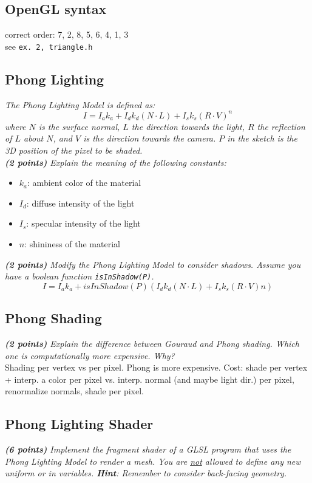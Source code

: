 \documentclass[a4paper,10pt]{article}
\begin{document}
\subsection{OpenGL syntax}
correct order: 
7, 2, 8, 5, 6, 4, 1, 3\\
see \texttt{ex. 2, triangle.h}
\subsection{Phong Lighting}
\textit{The Phong Lighting Model is defined as:}
\[I=I_ak_a+I_dk_d(N\cdot L)+I_sk_s(R\cdot V)^n\]
\textit{where  $N$  is  the  surface  normal,  $L$  the  direction  towards  the  light,  $R$  the  reflection  of  $L$  about  $N$,  and  $V$  is  the  direction  towards  the  camera. $P$ in the sketch is the 3D position of the pixel to be shaded.}\\

\textit{\textbf{(2 points)} Explain the meaning of the following constants:}
\begin{itemize}
	\item $k_a$: ambient color of the material
	\item $I_d$: diffuse intensity of the light
	\item $I_s$: specular intensity of the light
	\item $n$: shininess of the material
\end{itemize}
 \textit{\textbf{(2 points)} Modify the Phong Lighting Model to consider shadows.  Assume you 
have a boolean function \texttt{isInShadow(P)}.}
\[I = I_ak_a + isInShadow(P)(I_d k_d (N \cdot L) + I_sk_s(R \cdot V )n)\]

\subsection{Phong Shading}
\textit{\textbf{(2 points)} Explain the difference between Gouraud and Phong shading. Which one is computationally more expensive. Why?}\\

Shading per vertex vs per pixel.  Phong is more expensive.  Cost:  shade per vertex + interp. a color per pixel vs.  interp. normal (and maybe light dir.) per pixel, renormalize normals,  shade per pixel.
\subsection{Phong Lighting Shader}
\textit{\textbf{(6 points)} Implement the fragment shader of a GLSL program that uses the Phong Lighting Model to render a mesh. You are \underline{not} allowed to define any new uniform or in variables. \textbf{Hint}: Remember to consider back-facing geometry.}\\
\end{document}
